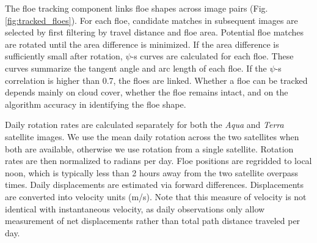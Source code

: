 \documentclass[aog]{igs}
\begin{document}
\begin{figure*}[!ht]
\caption{Floe shapes and trajectories for a set of floes tracked in \textit{Aqua} imagery from April 27-30, 2014. Satellite overpass time is marked in the title. Image location is shown in Fig. \ref{fig:study_region}. Markers show the position of the floe centroid at the image time, while hollow circles show the position of the centroid in the previous images.}
\label{fig:tracked_floes}
\end{figure*}

The floe tracking component links floe shapes across image pairs (Fig. \ref{fig:tracked_floes}). For each floe, candidate matches in subsequent images are selected by first filtering by travel distance and floe area. Potential floe matches are rotated until the area difference is minimized. If the area difference is sufficiently small after rotation, $\psi$-s curves \citep{kwok1990_IcemotionTracking} are calculated for each floe. These curves summarize the tangent angle and arc length of each floe. If the $\psi$-s correlation is higher than 0.7, the floes are linked. Whether a floe can be tracked depends mainly on cloud cover, whether the floe remains intact, and on the algorithm accuracy in identifying the floe shape. 

Daily rotation rates are calculated separately for both the \textit{Aqua} and \textit{Terra} satellite images. We use the mean daily rotation across the two satellites when both are available, otherwise we use rotation from a single satellite. Rotation rates are then normalized to radians per day.
Floe positions are regridded to local noon, which is typically less than 2 hours away from the two satellite overpass times. Daily displacements are estimated via forward differences. Displacements are converted into velocity units (m/s). Note that this measure of velocity is not identical with instantaneous velocity, as daily observations only allow measurement of net displacements rather than total path distance traveled per day. 

\begin{figure*}
\caption{Top: spatial histograms of (a) all available sea ice floe shapes and (b) tracked floes. Floe centroids were binned into 25 km by 25 km grid cells for enumeration. (c) Ice floe trajectories for floes tracked for a period of at least 7 days.
Bottom: (d) Number of floes per year in the raw IFT output (blue) and after postprocessing (orange). The number of tracked floes is shown in green and the number of rotation rate estimates is in pink. (e). Distribution of the number of floes per image as a function of day of year. Counts were smoothed using a 15-day centered median. (f) Histograms of trajectory lengths in days for each year.}
\label{fig:data_avail}
\end{figure*}
\end{document}
